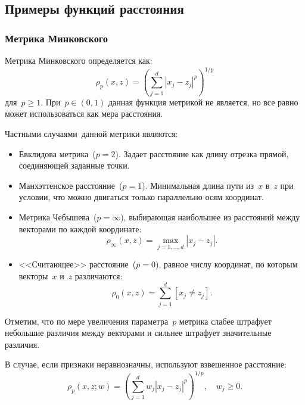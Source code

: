\documentclass[12pt,fleqn]{article}
\begin{document}

    \subsection{Примеры функций расстояния}
        \subsubsection{Метрика Минковского}
        Метрика Минковского определяется как:
        \[
            \rho_p(x, z) = \left(
                \sum_{j = 1}^{d} |x_j - z_j|^p
            \right)^{1/p}
        \]
        для~$p \geq 1$.
        При~$p \in (0, 1)$ данная функция метрикой не является, но все равно может использоваться как мера расстояния.

        Частными случаями~данной метрики являются:
        \begin{itemize}
            \item Евклидова метрика~($p = 2$).
                Задает расстояние как длину отрезка прямой, соединяющей заданные точки.
            \item Манхэттенское расстояние~($p = 1$).
                Минимальная длина пути из~$x$ в~$z$ при условии,
                что можно двигаться только параллельно осям координат.
            \item Метрика Чебышева~($p = \infty$), выбирающая наибольшее из расстояний между векторами по каждой координате:
                \[
                    \rho_\infty(x, z) = \max_{j = 1, \dots, d} |x_j- z_j|.
                \]
            \item <<Считающее>> расстояние~($p = 0$), равное числу координат, по которым векторы~$x$ и~$z$ различаются:
                \[
                    \rho_0(x, z) = \sum_{j = 1}^{d} [x_j \neq z_j].
                \]
        \end{itemize}

        Отметим, что по мере увеличения параметра~$p$ метрика слабее штрафует
        небольшие различия между векторами и сильнее штрафует значительные различия.



        В случае, если признаки неравнозначны, используют взвешенное расстояние:
        \[
            \rho_p(x, z; w) = \left(
                \sum_{j = 1}^{d} w_j |x_j - z_j|^p
            \right)^{1/p},
            \quad
            w_j \geq 0.
        \]
\end{document}
